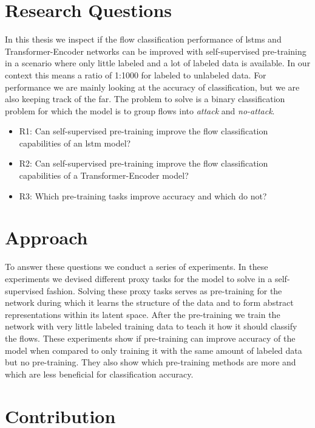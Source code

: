\section{Research Questions} \label{sect.research_questions}

In this thesis we inspect if the flow classification performance of \glspl{lstm} and Transformer-Encoder networks can be improved with self-supervised pre-training in a scenario where only little labeled and a lot of labeled data is available. In our context this means a ratio of 1:1000 for labeled to unlabeled data. For performance we are mainly looking at the accuracy of classification, but we are also keeping track of the \gls{far}. The problem to solve is a binary classification problem for which the model is to group flows into \textit{attack} and \textit{no-attack}. 

\begin{itemize}
	\item R1: Can self-supervised pre-training improve the flow classification capabilities of an \gls{lstm} model?
	\item R2: Can self-supervised pre-training improve the flow classification capabilities of a Transformer-Encoder model?
	\item R3: Which pre-training tasks improve accuracy and which do not?
\end{itemize}


\section{Approach} \label{sect.approach}

To answer these questions we conduct a series of experiments. In these experiments we devised different proxy tasks for the model to solve in a self-supervised fashion. Solving these proxy tasks serves as pre-training for the network during which it learns the structure of the data and to form abstract representations within its latent space. After the pre-training we train the network with very little labeled training data to teach it how it should classify the flows. These experiments show if pre-training can improve accuracy of the model when compared to only training it with the same amount of labeled data but no pre-training. They also show which pre-training methods are more and which are less beneficial for classification accuracy.

\section{Contribution} \label{sect.contribution}

